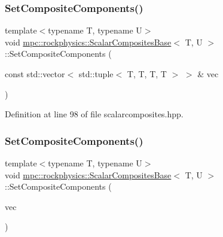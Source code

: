 \subsubsection{\texorpdfstring{Set\+Composite\+Components()}{SetCompositeComponents()}\hspace{0.1cm}{\footnotesize\ttfamily [1/2]}}
{\footnotesize\ttfamily template$<$typename T, typename U$>$ \\
void \mbox{\hyperlink{classmpc_1_1rockphysics_1_1_scalar_composites_base}{mpc\+::rockphysics\+::\+Scalar\+Composites\+Base}}$<$ T, U $>$\+::Set\+Composite\+Components (\begin{DoxyParamCaption}\item[{const std\+::vector$<$ std\+::tuple$<$ T, T, T, T $>$ $>$ \&}]{vec }\end{DoxyParamCaption})\hspace{0.3cm}{\ttfamily [inline]}}



Definition at line 98 of file scalarcomposites.\+hpp.

\mbox{\label{classmpc_1_1rockphysics_1_1_scalar_composites_base_a1866cddad44ffcc54ef178eb914cad2c}} 
\subsubsection{\texorpdfstring{Set\+Composite\+Components()}{SetCompositeComponents()}\hspace{0.1cm}{\footnotesize\ttfamily [2/2]}}
{\footnotesize\ttfamily template$<$typename T, typename U$>$ \\
void \mbox{\hyperlink{classmpc_1_1rockphysics_1_1_scalar_composites_base}{mpc\+::rockphysics\+::\+Scalar\+Composites\+Base}}$<$ T, U $>$\+::Set\+Composite\+Components (\begin{DoxyParamCaption}\item[{const std\+::vector$<$ std\+::tuple$<$ \mbox{\hyperlink{structmpc_1_1rockphysics_1_1_bulk_modulus_type}{mpc\+::rockphysics\+::\+Bulk\+Modulus\+Type}}$<$ T $>$, \mbox{\hyperlink{structmpc_1_1rockphysics_1_1_shear_modulus_type}{mpc\+::rockphysics\+::\+Shear\+Modulus\+Type}}$<$ T $>$, \mbox{\hyperlink{structmpc_1_1rockphysics_1_1_density_type}{mpc\+::rockphysics\+::\+Density\+Type}}$<$ T $>$, \mbox{\hyperlink{structmpc_1_1rockphysics_1_1_volume_fraction_type}{mpc\+::rockphysics\+::\+Volume\+Fraction\+Type}}$<$ T $>$ $>$ $>$ \&}]{vec }\end{DoxyParamCaption})\hspace{0.3cm}{\ttfamily [inline]}}



